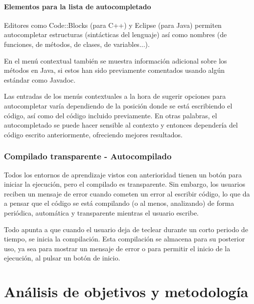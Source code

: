 \documentclass{report}
\begin{document}
	\subsubsection{Elementos para la lista de autocompletado}
	
	Editores como Code::Blocks (para C++) y Eclipse (para Java) permiten autocompletar estructuras (sintácticas del lenguaje) así como nombres (de funciones, de métodos, de clases, de variables...).
	
	\vspace{10px}
	
	En el menú contextual también se muestra información adicional sobre los métodos en Java, si estos han sido previamente comentados usando algún estándar como Javadoc\cite{javadoc}.
	
	\vspace{10px}
	
	Las entradas de los menús contextuales a la hora de sugerir opciones para autocompletar varía dependiendo de la posición donde se está escribiendo el código, así como del código incluido previamente. En otras palabras, el autocompletado se puede hacer sensible al contexto y entonces dependería del código escrito anteriormente, ofreciendo mejores resultados.
	
	\subsection{Compilado transparente - Autocompilado}
	
	Todos los entornos de aprendizaje vistos con anterioridad tienen un botón para iniciar la ejecución, pero el compilado es transparente. Sin embargo, los usuarios reciben un mensaje de error cuando cometen un error al escribir código, lo que da a pensar que el código se está compilando (o al menos, analizando) de forma periódica, automática y transparente mientras el usuario escribe. 
	
	\vspace{10px}
	
	Todo apunta a que cuando el usuario deja de teclear durante un corto periodo de tiempo, se inicia la compilación. Esta compilación se almacena para su posterior uso, ya sea para mostrar un mensaje de error o para permitir el inicio de la ejecución, al pulsar un botón de inicio.
	
	\chapter{Análisis de objetivos y metodología}
	
\end{document}
